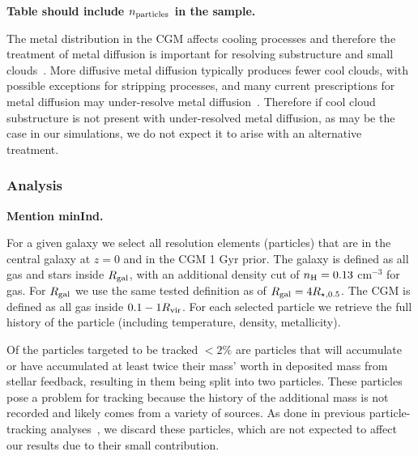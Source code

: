 \documentclass[fleqn,usenatbib]{mnras}
\begin{document}
\textbf{Table should include $n_{\rm particles}$ in the sample.}

The metal distribution in the CGM affects cooling processes and therefore the treatment of metal diffusion is important for resolving substructure and small clouds~\cite{rennehan2021}.
More diffusive metal diffusion typically produces fewer cool clouds, with possible exceptions for stripping processes, and many current prescriptions for metal diffusion may under-resolve metal diffusion~\citep[e.g.][]{rennehan2019, rennehan2021}.
Therefore if cool cloud substructure is not present with under-resolved metal diffusion, as may be the case in our simulations, we do not expect it to arise with an alternative treatment.

\subsubsection{Analysis}
\label{s: methods -- analysis}

\textbf{Mention minInd.}

For a given galaxy we select all resolution elements (particles) that are in the central galaxy at $z=0$ and in the CGM 1 Gyr prior.
The galaxy is defined as all gas and stars inside $R_{\rm gal}$, with an additional density cut of $n_{\rm H} = 0.13$ cm$^{-3}$ for gas.
For $R_{\rm gal}$ we use the same tested definition as \cite{Hafen2019, Hafen2020} of $R_{\rm gal} = 4 R_{\star,0.5}$.
The CGM is defined as all gas inside $0.1 -1 R_{\rm vir}$.
For each selected particle we retrieve the full history of the particle (including temperature, density, metallicity).

Of the particles targeted to be tracked $<2\%$ are particles that will accumulate or have accumulated at least twice their mass' worth in deposited mass from stellar feedback, resulting in them being split into two particles.
These particles pose a problem for tracking because the history of the additional mass is not recorded and likely comes from a variety of sources.
As done in previous particle-tracking analyses~\citep{Hafen2019, Hafen2020}, we discard these particles, which are not expected to affect our results due to their small contribution.
\end{document}
